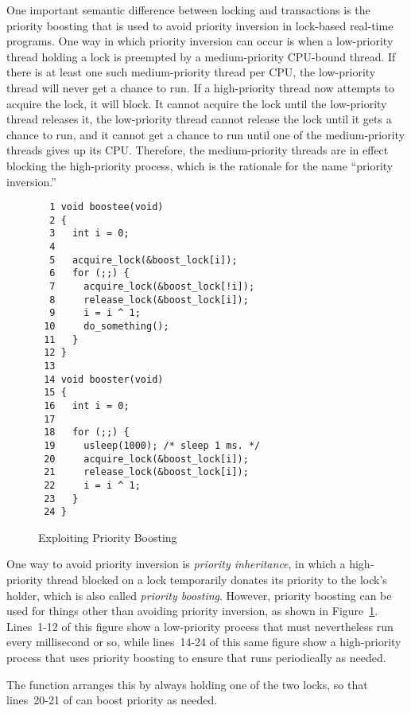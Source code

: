 One important semantic difference between locking and transactions
is the priority boosting that is used to avoid priority inversion
in lock-based real-time programs.
One way in which priority inversion can occur is when a
low-priority thread holding a lock
is preempted by a medium-priority CPU-bound thread.
If there is at least one such medium-priority thread per CPU, the
low-priority thread will never get a chance to run.
If a high-priority thread now attempts to acquire the lock,
it will block.
It cannot acquire the lock until the low-priority thread releases it,
the low-priority thread cannot release the lock until it gets a chance
to run, and it cannot get a chance to run until one of the medium-priority
threads gives up its CPU.
Therefore, the medium-priority threads are in effect blocking the
high-priority process, which is the rationale for the name ``priority
inversion.''

\begin{figure}[tbp]
{ \scriptsize
\begin{verbatim}
  1 void boostee(void)
  2 {
  3   int i = 0;
  4 
  5   acquire_lock(&boost_lock[i]);
  6   for (;;) {
  7     acquire_lock(&boost_lock[!i]);
  8     release_lock(&boost_lock[i]);
  9     i = i ^ 1;
 10     do_something();
 11   }
 12 }
 13 
 14 void booster(void)
 15 {
 16   int i = 0;
 17 
 18   for (;;) {
 19     usleep(1000); /* sleep 1 ms. */
 20     acquire_lock(&boost_lock[i]);
 21     release_lock(&boost_lock[i]);
 22     i = i ^ 1;
 23   }
 24 }
\end{verbatim}
}
\caption{Exploiting Priority Boosting}
\label{fig:future:Exploiting Priority Boosting}
\end{figure}

One way to avoid priority inversion is \emph{priority inheritance},
in which a high-priority thread blocked on a lock temporarily donates
its priority to the lock's holder, which is also called \emph{priority
boosting}.
However, priority boosting can be used for things other than avoiding
priority inversion, as shown in
Figure~\ref{fig:future:Exploiting Priority Boosting}.
Lines~1-12 of this figure show a low-priority process that must
nevertheless run every millisecond or so, while lines~14-24 of
this same figure show a high-priority process that uses priority
boosting to ensure that  runs periodically as needed.

The  function arranges this by always holding one of
the two  locks, so that lines~20-21 of
 can boost priority as needed.

